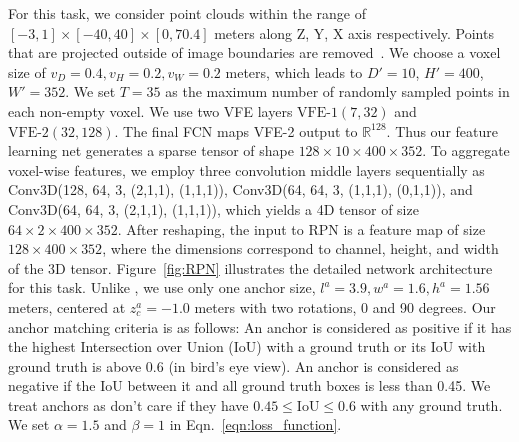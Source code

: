 \documentclass[10pt,twocolumn,letterpaper]{article}
\begin{document}
  For this task, we consider point clouds within the range of $[-3, 1] \times [-40, 40] \times [0, 70.4]$ meters along Z, Y, X axis respectively. Points that are projected outside of image boundaries are removed~\cite{REF:cvpr17chen}. We choose a voxel size of $v_D=0.4, v_H=0.2, v_W=0.2$ meters, which leads to $D'=10$, $H'=400$, $W'=352$. We set $T=35$ as the maximum number of randomly sampled points in each non-empty voxel. We use two VFE layers $\textrm{VFE-1}(7, 32)$ and $\textrm{VFE-2}(32, 128)$. The final FCN maps VFE-2 output to $\mathbb{R}^{128}$. Thus our feature learning net generates a sparse tensor of shape $128 \times 10 \times 400 \times 352$. To aggregate voxel-wise features, we employ three convolution middle layers sequentially as Conv3D(128, 64, 3, (2,1,1), (1,1,1)), Conv3D(64, 64, 3, (1,1,1), (0,1,1)), and Conv3D(64, 64, 3, (2,1,1), (1,1,1)), which yields a 4D tensor of size $64 \times 2 \times 400 \times 352$. After reshaping, the input to RPN is a feature map of size $128 \times 400 \times 352$, where the dimensions correspond to channel, height, and width of the 3D tensor. Figure~\ref{fig:RPN} illustrates the detailed network architecture for this task. Unlike \cite{REF:cvpr17chen}, we use only one anchor size, $l^a=3.9, w^a=1.6, h^a=1.56$ meters, centered at $z_c^a = -1.0$ meters with two rotations, 0 and 90 degrees. 
Our anchor matching criteria is as follows: An anchor is considered as positive if it has the highest Intersection over Union (IoU) with a ground truth or its IoU with ground truth is above 0.6 (in bird's eye view). An anchor is considered as negative if the IoU between it and all ground truth boxes is less than 0.45. We treat anchors as don't care if they have $0.45 \leq \textrm{IoU} \leq 0.6$ with any ground truth. We set $\alpha = 1.5$ and $\beta = 1$ in Eqn.~\ref{eqn:loss_function}.
\end{document}
